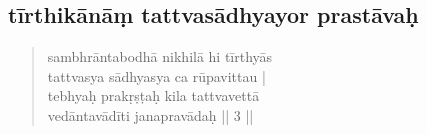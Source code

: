 \documentclass[12pt]{article}
\begin{document}
% 

\subsection{tīrthikānāṃ tattvasādhyayor prastāvaḥ}
\begin{quote}
	sambhrāntabodhā nikhilā hi tīrthyās \\%
	tattvasya sādhyasya ca rūpavittau |\\
	tebhyaḥ prakṛṣṭaḥ kila tattvavettā\\
	vedāntavādīti janapravādaḥ || 3 ||

% 
\end{quote}
\end{document}
